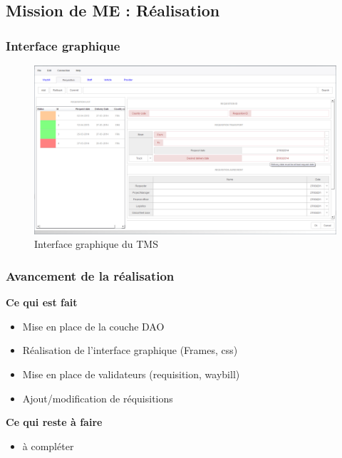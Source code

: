 \subsection{Mission de ME : Réalisation}
	\begin{frame}
		\frametitle{Interface graphique}
		\begin{figure}[htbp]
			\centering
			\includegraphics[scale=0.24]{Images/Interface}
			\caption{Interface graphique du TMS}
		\end{figure}
	\end{frame}
	\begin{frame}		
		\frametitle{Avancement de la réalisation}
		\begin{block}{\textbf{Ce qui est fait}}
			\begin{itemize}
				\item Mise en place de la couche DAO
				\item Réalisation de l'interface graphique (Frames, css)
				\item Mise en place de validateurs (requisition, waybill)
				\item Ajout/modification de réquisitions
			\end{itemize}
		\end{block}
		\begin{block}{\textbf{Ce qui reste à faire}}
			\begin{itemize}
				\item à compléter
			\end{itemize}
		\end{block}
	\end{frame}